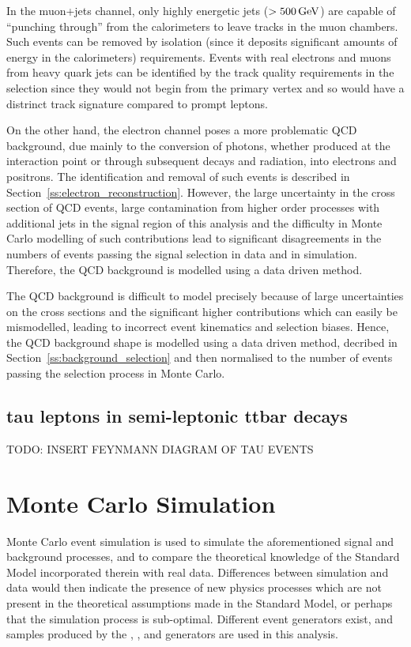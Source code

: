 In the muon+jets channel, only highly energetic jets (\pt $> 500\,\text{Ge\hspace{-.08em}V}$) are capable of ``punching through''
from the calorimeters to leave tracks in the muon chambers. Such events can be removed by isolation (since it
deposits significant amounts of energy in the calorimeters) requirements. Events with real electrons and muons
from heavy quark jets can be identified by the track quality requirements in the selection since they would
not begin from the primary vertex and so would have a distrinct track signature compared to prompt leptons.

On the other hand, the electron channel poses a more problematic QCD background, due mainly to the conversion
of photons, whether produced at the interaction point or through subsequent decays and radiation, into
electrons and positrons. The identification and removal of such events is described in
Section~\ref{ss:electron_reconstruction}. However, the large uncertainty in the cross section of QCD events,
large contamination from higher order processes with additional jets in the signal region of this analysis and
the difficulty in Monte Carlo modelling of such contributions lead to significant disagreements in the numbers
of events passing the signal selection in data and in simulation. Therefore, the QCD background is modelled
using a data driven method.

The QCD background is difficult to model precisely because of large uncertainties on the cross sections and
the significant higher contributions which can easily be mismodelled, leading to incorrect event kinematics
and selection biases. Hence, the QCD background shape is modelled using a data driven method, decribed in
Section~\ref{ss:background_selection} and then normalised to the number of events passing the selection
process in Monte Carlo.


\subsection{tau leptons in semi-leptonic ttbar decays}
\label{ss:taus_in_semi-leptonic_decays}
 TODO: INSERT FEYNMANN
DIAGRAM OF TAU EVENTS %

\section{Monte Carlo Simulation}
\label{s:monte_carlo_simulation}

Monte Carlo event simulation is used to simulate the aforementioned signal and background processes, and to
compare the theoretical knowledge of the Standard Model incorporated therein with real data. Differences
between simulation and data would then indicate the presence of new physics processes which are not present in
the theoretical assumptions made in the Standard Model, or perhaps that the simulation process is sub-optimal.
Different event generators exist, and samples produced by the \MADGRAPH, \PYTHIA, \POWHEG and \HERWIG
generators are used in this analysis.

